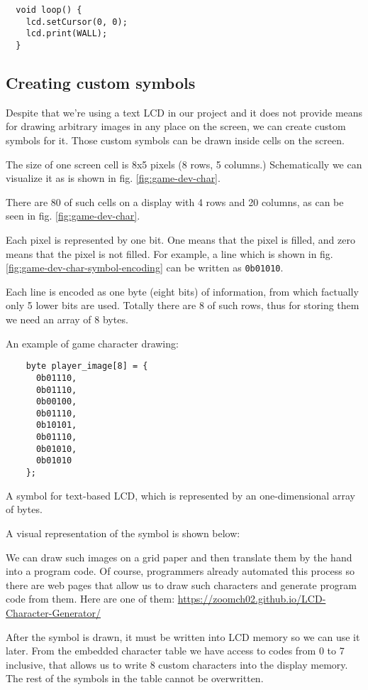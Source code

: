 \documentclass[../sparc.tex]{subfiles}
\begin{document}
\begin{verbatim}
  void loop() {
    lcd.setCursor(0, 0);
    lcd.print(WALL);
  }
\end{verbatim}

\subsection{Creating custom symbols}

Despite that we're using a text LCD in our project and it does not provide means
for drawing arbitrary images in any place on the screen, we can create custom
symbols for it.  Those custom symbols can be drawn inside cells on the screen.

The size of one screen cell is 8x5 pixels (8 rows, 5 columns.)  Schematically we
can visualize it as is shown in fig. \ref{fig:game-dev-char}.


There are 80 of such cells on a display with 4 rows and 20 columns, as can be
seen in fig. \ref{fig:game-dev-char}.

Each pixel is represented by one bit.  One means that the pixel is filled, and
zero means that the pixel is not filled.  For example, a line which is shown in
fig. \ref{fig:game-dev-char-symbol-encoding} can be written as
\texttt{0b01010}.


Each line is encoded as one byte (eight bits) of information, from which
factually only 5 lower bits are used.  Totally there are 8 of such rows, thus
for storing them we need an array of 8 bytes.

An example of game character drawing:

\begin{listing}[H]
  \begin{verbatim}
    byte player_image[8] = {
      0b01110,
      0b01110,
      0b00100,
      0b01110,
      0b10101,
      0b01110,
      0b01010,
      0b01010
    };
  \end{verbatim}
  \caption{A symbol for text-based LCD, which is represented by an
    one-dimensional array of bytes.}
  \label{listing:game-dev-lcd-custom-char}
\end{listing}

A visual representation of the symbol is shown below:


We can draw such images on a grid paper and then translate them by the hand into
a program code.  Of course, programmers already automated this process so there
are web pages that allow us to draw such characters and generate program code
from them.  Here are one of them:
\url{https://zoomch02.github.io/LCD-Character-Generator/}

After the symbol is drawn, it must be written into LCD memory so we can use it
later.  From the embedded character table we have access to codes from 0 to 7
inclusive, that allows us to write 8 custom characters into the display memory.
The rest of the symbols in the table cannot be overwritten.
\end{document}
